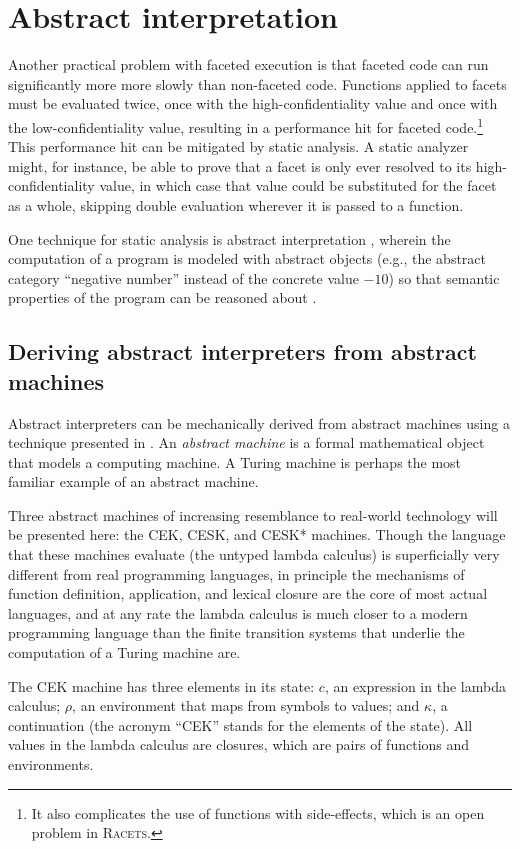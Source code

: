 \documentclass{article}
\begin{document}
\section{Abstract interpretation\label{sec:ai}}
Another practical problem with faceted execution is that faceted code can run significantly more more slowly than non-faceted code. Functions applied to facets must be evaluated twice, once with the high-confidentiality value and once with the low-confidentiality value, resulting in a performance hit for faceted code.\footnote{It also complicates the use of functions with side-effects, which is an open problem in \textsc{Racets}.} This performance hit can be mitigated by static analysis. A static analyzer might, for instance, be able to prove that a facet is only ever resolved to its high-confidentiality value, in which case that value could be substituted for the facet as a whole, skipping double evaluation wherever it is passed to a function.

One technique for static analysis is abstract interpretation \cite{abstract-inter}, wherein the computation of a program is modeled with abstract objects (e.g., the abstract category ``negative number'' instead of the concrete value $-10$) so that semantic properties of the program can be reasoned about \cite{ai-original}.



\subsection{Deriving abstract interpreters from abstract machines}
Abstract interpreters can be mechanically derived from abstract machines using a technique presented in \cite{aam}. An \textit{abstract machine} is a formal mathematical object that models a computing machine. A Turing machine is perhaps the most familiar example of an abstract machine.

Three abstract machines of increasing resemblance to real-world technology will be presented here: the CEK, CESK, and CESK* machines. Though the language that these machines evaluate (the untyped lambda calculus) is superficially very different from real programming languages, in principle the mechanisms of function definition, application, and lexical closure are the core of most actual languages, and at any rate the lambda calculus is much closer to a modern programming language than the finite transition systems that underlie the computation of a Turing machine are.

The CEK machine has three elements in its state: $c$, an expression in the lambda calculus; $\rho$, an environment that maps from symbols to values; and $\kappa$, a continuation (the acronym ``CEK'' stands for the elements of the state). All values in the lambda calculus are closures, which are pairs of functions and environments.
\end{document}
